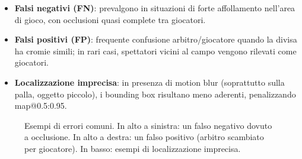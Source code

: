 \documentclass[12pt,a4paper,openright,twoside]{book}
\begin{document}
\begin{itemize}
  \item \textbf{Falsi negativi (FN)}: prevalgono in situazioni di forte affollamento nell'area di gioco, con occlusioni 
  quasi complete tra giocatori.
  \item \textbf{Falsi positivi (FP)}: frequente confusione arbitro/giocatore quando la divisa ha cromie simili; 
  in rari casi, spettatori vicini al campo vengono rilevati come giocatori.
  \item \textbf{Localizzazione imprecisa}: in presenza di motion blur (soprattutto sulla palla, oggetto piccolo), 
  i bounding box risultano meno aderenti, penalizzando \ac{map}@0.5:0.95.
\end{itemize}


\begin{figure}[h]
  \centering
  \caption{Esempi di errori comuni. In alto a sinistra: un falso negativo dovuto a occlusione. In alto a destra: un falso positivo (arbitro scambiato per giocatore). In
basso: esempi di localizzazione imprecisa.}
  \label{fig:error_analysis_examples}
\end{figure}
\end{document}
